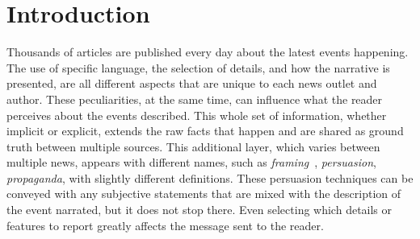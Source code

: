 \chapter{\statusgreen Introduction}
\label{chap:intro}



Thousands of articles are published every day about the latest events happening.
The use of specific language, the selection of details, and how the narrative is presented, are all different aspects that are unique to each news outlet and author.
These peculiarities, at the same time, can influence what the reader perceives about the events described.
This whole set of information, whether implicit or explicit, extends the raw facts that happen and are shared as ground truth between multiple sources. This additional layer, which varies between multiple news, appears with different names, such as \emph{framing}~\cite{gamson1989media,scheufele1999framing}, \emph{persuasion}, \emph{propaganda}, with slightly different definitions.
These persuasion techniques can be conveyed with any subjective statements that are mixed with the description of the event narrated, but it does not stop there.
Even selecting which details or features to report greatly affects the message sent to the reader.

